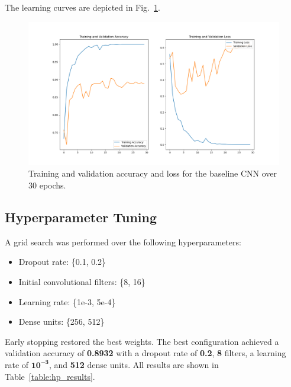 \documentclass[conference]{IEEEtran}
\begin{document}
The learning curves are depicted in Fig.~\ref{fig:baseline_curves}.

\begin{figure}[htbp]
	\centerline{\includegraphics[width=\linewidth]{Images/baseline_curves.png}}
	\caption{Training and validation accuracy and loss for the baseline CNN over 30 epochs.}
	\label{fig:baseline_curves}
\end{figure}

\subsection{Hyperparameter Tuning}
A grid search was performed over the following hyperparameters:
\begin{itemize}
	\item Dropout rate: \{0.1, 0.2\}
	\item Initial convolutional filters: \{8, 16\}
	\item Learning rate: \{1e-3, 5e-4\}
	\item Dense units: \{256, 512\}
\end{itemize}

Early stopping restored the best weights. The best configuration achieved a validation accuracy of \textbf{0.8932} with a dropout rate of \textbf{0.2}, \textbf{8} filters, a learning rate of \(\mathbf{10^{-3}}\), and \textbf{512} dense units. All results are shown in Table~\ref{table:hp_results}.
\end{document}
